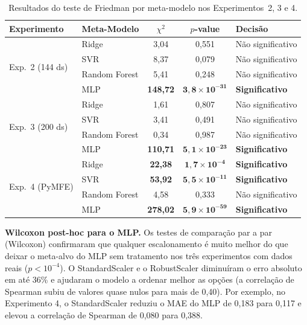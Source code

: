 \documentclass[12pt]{article}
\begin{document}
\begin{table}[H]
\centering
\caption{Resultados do teste de Friedman por meta-modelo nos Experimentos~2, 3 e 4.}
\label{tab:friedman_all}
\small
\begin{tabular}{llccl}
\toprule
\textbf{Experimento} & \textbf{Meta-Modelo} & \textbf{$\chi^2$} & \textbf{$p$-value} & \textbf{Decisão} \\
\midrule
\multirow{4}{*}{Exp.~2 (144 ds)}
 & Ridge        & 3,04            & 0,551                                    & Não significativo \\
 & SVR          & 8,37            & 0,079                                    & Não significativo \\
 & Random Forest & 5,41           & 0,248                                    & Não significativo \\
 & MLP          & \textbf{148,72} & $\mathbf{3{,}8 \times 10^{-31}}$        & \textbf{Significativo} \\
\midrule
\multirow{4}{*}{Exp.~3 (200 ds)}
 & Ridge        & 1,61            & 0,807                                    & Não significativo \\
 & SVR          & 3,41            & 0,491                                    & Não significativo \\
 & Random Forest & 0,34           & 0,987                                    & Não significativo \\
 & MLP          & \textbf{110,71} & $\mathbf{5{,}1 \times 10^{-23}}$        & \textbf{Significativo} \\
\midrule
\multirow{4}{*}{Exp.~4 (PyMFE)}
 & Ridge        & \textbf{22,38}  & $\mathbf{1{,}7 \times 10^{-4}}$         & \textbf{Significativo} \\
 & SVR          & \textbf{53,92}  & $\mathbf{5{,}5 \times 10^{-11}}$        & \textbf{Significativo} \\
 & Random Forest & 4,58           & 0,333                                    & Não significativo \\
 & MLP          & \textbf{278,02} & $\mathbf{5{,}9 \times 10^{-59}}$        & \textbf{Significativo} \\
\bottomrule
\end{tabular}
\end{table}

\textbf{Wilcoxon post-hoc para o MLP.} Os testes de comparação par a par (Wilcoxon) confirmaram que qualquer escalonamento é muito melhor do que deixar o meta-alvo do MLP sem tratamento nos três experimentos com dados reais ($p < 10^{-4}$). O StandardScaler e o RobustScaler diminuíram o erro absoluto em até 36\% e ajudaram o modelo a ordenar melhor as opções (a correlação de Spearman subiu de valores quase nulos para mais de 0,40). Por exemplo, no Experimento 4, o StandardScaler reduziu o MAE do MLP de 0,183 para 0,117 e elevou a correlação de Spearman de 0,080 para 0,388.
\end{document}
